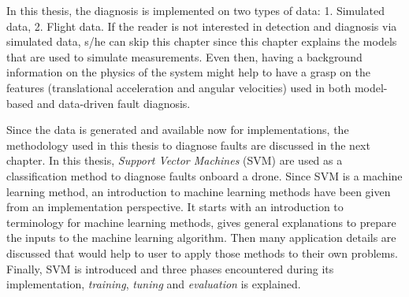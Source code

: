 In this thesis, the diagnosis is implemented on two types of data: 1. Simulated data, 2.
Flight data. 
If the reader is not interested in detection and diagnosis via simulated data, s/he can skip this chapter since this chapter explains the models that are used to simulate measurements.
Even then, having a background information on the physics of the system might help to have a grasp on the features (translational acceleration and angular velocities) used in both model-based and data-driven fault diagnosis.

Since the data is generated and available now for implementations, the methodology used in this thesis to diagnose faults are discussed in the next chapter. 
In this thesis, \emph{Support Vector Machines} (SVM) are used as a classification method to diagnose faults onboard a drone. 
Since SVM is a machine learning method, an introduction to machine learning methods have been given from an implementation perspective. 
It starts with an introduction to terminology for machine learning methods, gives general explanations to prepare the inputs to the machine learning algorithm. 
Then many application details are discussed that would help to user to apply those methods to their own problems. 
Finally, SVM is introduced and three phases encountered during its implementation, \emph{training}, \emph{tuning} and \emph{evaluation} is explained.


